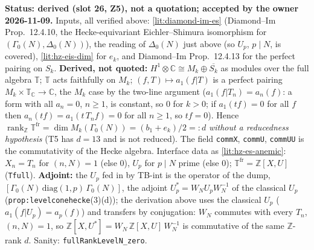 \begin{hypothesis}\label{lit:hz-es-full}
  \leanok
  \textbf{Status: derived (slot 26, Z5), not a quotation; accepted by the owner 2026-11-09.} Inputs, all verified above: \ref{lit:diamond-im-es}
  (Diamond--Im Prop.~12.4.10, the Hecke-equivariant Eichler--Shimura isomorphism for $(\Gamma_0(N),\Delta_0(N))$), the reading of
  $\Delta_0(N)$ just above (so $U_p$, $p\mid N$, is covered), \ref{lit:hz-eis-dim} for $e_k$, and Diamond--Im Prop.~12.4.13 for the
  perfect pairing on $S_k$. \textbf{Derived, not quoted:} $H^1\otimes\mathbb C\cong M_k\oplus\overline{S_k}$ as modules over the full algebra
  $\mathbb T$; $\mathbb T$ acts faithfully on $M_k$; $(f,T)\mapsto a_1(f|T)$ is a perfect pairing $M_k\times\mathbb T_{\mathbb C}\to\mathbb C$, the
  $M_k$ case by the two-line argument ($a_1(f|T_n)=a_n(f)$: a form with all $a_n=0$, $n\ge1$, is constant, so $0$ for $k>0$; if
  $a_1(tf)=0$ for all $f$ then $a_n(tf)=a_1(t\,T_nf)=0$ for all $n\ge1$, so $tf=0$). Hence $\operatorname{rank}_{\mathbb Z}\mathbb T^{\mathrm{fr}}=\dim M_k(\Gamma_0(N))=(b_1+e_k)/2=:d$
  \emph{without a reducedness hypothesis} (T5 has $d=13$ and is not reduced). The field \texttt{commX}, \texttt{commU}, \texttt{commUU} is the
  commutativity of the Hecke algebra. Interface data as \ref{lit:hz-es-anemic}: $X_n=T_n$ for $(n,N)=1$ (else $0$), $U_p$ for $p\mid N$ prime (else $0$);
  $\mathbb T^{\mathrm{fr}}=\mathbb Z[X,U]$ (\texttt{Tfull}). \textbf{Adjoint:} the $U_p$ fed in by TB-int is the operator of the dump,
  $[\Gamma_0(N)\,\mathrm{diag}(1,p)\,\Gamma_0(N)]$, the adjoint $U_p^*=W_NU_pW_N^{-1}$ of the classical $U_p$ (\texttt{prop:levelconehecke}(3)(d));
  the derivation above uses the classical $U_p$ ($a_1(f|U_p)=a_p(f)$) and transfers by conjugation: $W_N$ commutes with every $T_n$, $(n,N)=1$, so
  $\mathbb Z[X,U^*]=W_N\,\mathbb Z[X,U]\,W_N^{-1}$ is commutative of the same $\mathbb Z$-rank $d$. Sanity: \texttt{fullRankLevelN\_zero}.
\end{hypothesis}

